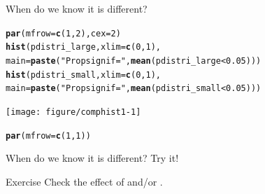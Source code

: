 \documentclass[10pt]{beamer}\usepackage[]{graphicx}\usepackage[]{color}
\makeatletter
\newcommand{\hlnum}[1]{\textcolor[rgb]{0.686,0.059,0.569}{#1}}%
\newcommand{\hlstr}[1]{\textcolor[rgb]{0.192,0.494,0.8}{#1}}%
\newcommand{\hlopt}[1]{\textcolor[rgb]{0,0,0}{#1}}%
\newcommand{\hlstd}[1]{\textcolor[rgb]{0.345,0.345,0.345}{#1}}%
\newcommand{\hlkwc}[1]{\textcolor[rgb]{0.333,0.667,0.333}{#1}}%
\newcommand{\hlkwd}[1]{\textcolor[rgb]{0.737,0.353,0.396}{\textbf{#1}}}%
\newenvironment{kframe}{%
 \def\at@end@of@kframe{}%
 \ifinner\ifhmode%
  \def\at@end@of@kframe{\end{minipage}}%
  \begin{minipage}{\columnwidth}%
 \fi\fi%
 \def\FrameCommand##1{\hskip\@totalleftmargin \hskip-\fboxsep
 \colorbox{shadecolor}{##1}\hskip-\fboxsep
     \hskip-\linewidth \hskip-\@totalleftmargin \hskip\columnwidth}%
 \MakeFramed {\advance\hsize-\width
   \@totalleftmargin\z@ \linewidth\hsize
   \@setminipage}}%
 {\par\unskip\endMakeFramed%
 \at@end@of@kframe}
\newenvironment{knitrout}{}{} %
\makeatother
\begin{document}
\begin{frame}[fragile]{When do we know it is different?}
\centering
\begin{knitrout}
\color{fgcolor}\begin{kframe}
\begin{alltt}
\hlkwd{par}\hlstd{(}\hlkwc{mfrow}\hlstd{=}\hlkwd{c}\hlstd{(}\hlnum{1}\hlstd{,}\hlnum{2}\hlstd{),} \hlkwc{cex}\hlstd{=}\hlnum{2}\hlstd{)}
\hlkwd{hist}\hlstd{(pdistri_large,} \hlkwc{xlim}\hlstd{=}\hlkwd{c}\hlstd{(}\hlnum{0}\hlstd{,}\hlnum{1}\hlstd{),}
     \hlkwc{main}\hlstd{=}\hlkwd{paste}\hlstd{(}\hlstr{"Prop signif="}\hlstd{,}\hlkwd{mean}\hlstd{(pdistri_large}\hlopt{<}\hlnum{0.05}\hlstd{)))}
\hlkwd{hist}\hlstd{(pdistri_small,} \hlkwc{xlim}\hlstd{=}\hlkwd{c}\hlstd{(}\hlnum{0}\hlstd{,}\hlnum{1}\hlstd{),}
     \hlkwc{main}\hlstd{=}\hlkwd{paste}\hlstd{(}\hlstr{"Prop signif="}\hlstd{,}\hlkwd{mean}\hlstd{(pdistri_small}\hlopt{<}\hlnum{0.05}\hlstd{)))}
\end{alltt}
\end{kframe}
\texttt{[image: figure/comphist1-1]} 
\begin{kframe}\begin{alltt}
\hlkwd{par}\hlstd{(}\hlkwc{mfrow}\hlstd{=}\hlkwd{c}\hlstd{(}\hlnum{1}\hlstd{,}\hlnum{1}\hlstd{))}
\end{alltt}
\end{kframe}
\end{knitrout}

\end{frame}

\begin{frame}[fragile]{When do we know it is different? Try it!}

\begin{alertblock}{Exercise}
Check the effect of {\color{orange}{smaller variability}} and/or {\color{blue}{larger sample size}}.
\end{alertblock}
\end{frame}
\end{document}
